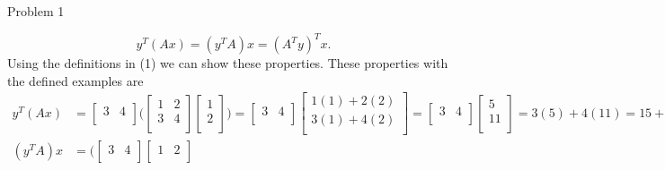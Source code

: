 \begin{problem}{Problem 1}
\begin{Highlight}[Solution]
        \begin{equation}
            y^{T}(Ax) = (y^{T}A)x = (A^{T}y)^{T}x.
        \end{equation}
        Using the definitions in (1) we can show these properties. These properties with the defined examples are 
        \begin{align*}
            y^{T}(Ax) & = 
            \begin{bmatrix}
                3 & 4 \\
            \end{bmatrix}
            \Biggl(
                \begin{bmatrix}
                    1 & 2 \\
                    3 & 4 \\
                \end{bmatrix}
                \begin{bmatrix}
                    1 \\
                    2 \\
                \end{bmatrix}
            \Biggr)
            = 
            \begin{bmatrix}
                3 & 4 \\
            \end{bmatrix}
            \begin{bmatrix}
                1(1) + 2(2) \\
                3(1) + 4(2) \\
            \end{bmatrix}
            =
            \begin{bmatrix}
                3 & 4 \\
            \end{bmatrix}
            \begin{bmatrix}
                5 \\
                11 \\
            \end{bmatrix}
            = 3(5) + 4(11) = 15 + 44 = 59 \\
            (y^{T}A)x & = 
            \Biggl(
                \begin{bmatrix}
                    3 & 4 \\
                \end{bmatrix}
                \begin{bmatrix}
                    1 & 2 \\

\end{bmatrix}
\end{align*}
\end{Highlight}
\end{problem}
